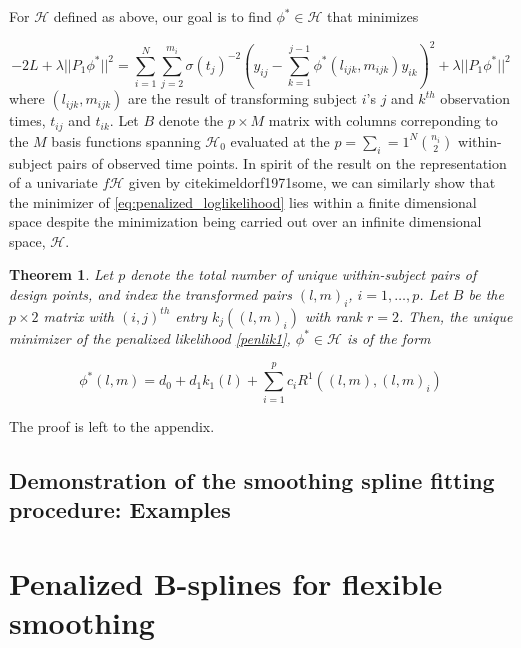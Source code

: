 \documentclass[12pt]{article}
\newtheorem{theorem}{Theorem}[section]
\theoremstyle{definition}
\begin{document}
For $\mathcal{H}$ defined as above, our goal is to find $\phi^* \in \mathcal{H}$  that minimizes 

\begin{equation} \label{eq:penalized_loglikelihood}
-2L + \lambda \vert \vert P_1 \phi^* \vert \vert^2 =  \sum_{i=1}^N \sum_{j=2}^{m_i} \sigma\left({t_j}\right)^{-2} \left(y_{ij} - \sum_{k=1}^{j-1}\phi^*\left({l_{ijk},m_{ijk}}\right)y_{ik} \right)^2 + \lambda  \vert \vert P_1 \phi^* \vert \vert^2
\end{equation}
\noindent
where $\left(l_{ijk}, m_{ijk}\right)$ are the result of transforming subject $i$'s $j$ and $k^{th}$ observation times, $t_{ij}$ and $t_{ik}$.  Let  $B$ denote the $p \times M$  matrix  with columns correponding to the $M$ basis functions spanning $\mathcal{H}_0$ evaluated at the $p = \sum_i=1^N {n_i \choose 2}$ within-subject pairs of observed time points.  In spirit of the result on the representation of a univariate $f \mathcal{H}$ given by cite{kimeldorf1971some}, we can similarly show that the minimizer of \ref{eq:penalized_loglikelihood} lies within a finite dimensional space despite the minimization being carried out over an infinite dimensional space, $\mathcal{H}$. 

\begin{theorem} \label{phi_representer_thm}
Let $p$ denote the total number of unique within-subject pairs of design points, and index the transformed pairs $\left( l,m \right)_i$, $i=1, \dots,p$. Let $B$ be the $p \times 2$ matrix with $\left(i,j\right)^{th}$ entry $k_j\left( \left( l,m \right)_i \right)$ with rank $r=2$. Then, the unique minimizer of the penalized likelihood \eqref{penlik1}, $\phi^* \in \mathcal{H}$ is of the form

\begin{equation}
\phi^*\left(l,m\right) = d_0 + d_1 k_1\left(l\right) + \sum_{i=1}^{p} c_i R^1\left( \left(l,m\right) , \left(l,m \right)_i\right)
 \label{eq:finitedimsolution}
\end{equation}
\end{theorem}

The proof is left to the appendix. 

\subsection{Demonstration of the smoothing spline fitting procedure: Examples}

\section{Penalized B-splines for flexible smoothing}
\end{document}
